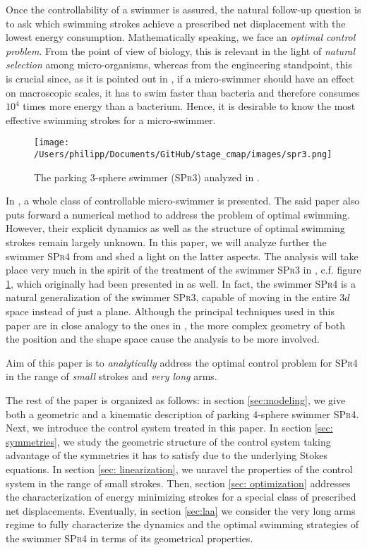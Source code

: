 Once the controllability of a swimmer is assured, the natural follow-up question is to ask which swimming strokes achieve a prescribed net displacement with the lowest energy consumption. Mathematically speaking, we face an \emph{optimal control problem}. From the point of view of biology, this is relevant in the light of \emph{natural selection} among micro-organisms, whereas from the engineering standpoint, this is crucial since, as it is pointed out in \cite{Avron2004}, if a micro-swimmer should have an effect on macroscopic scales, it has to swim faster than bacteria and therefore consumes $10^4$ times more energy than a bacterium. Hence, it is desirable to know the most effective swimming strokes for a micro-swimmer.

\begin{figure}[h]
\centering
	\texttt{[image: /Users/philipp/Documents/GitHub/stage\_cmap/images/spr3.png]}
    \caption{The parking 3-sphere swimmer (\textsc{SPr3}) analyzed in \cite{Alouges2017}.}
    \label{fig:spr3}
\end{figure}

In \cite{Alouges2013}, a whole class of controllable micro-swimmer is presented. The said paper also puts forward a numerical method to address the problem of optimal swimming. However, their explicit dynamics as well as the structure of optimal swimming strokes remain largely unknown. In this paper, we will analyze further the swimmer \textsc{SPr4} from \cite{Alouges2013} and shed a light on the latter aspects. The analysis will take place very much in the spirit of the treatment of the swimmer \textsc{SPr3} in \cite{Alouges2017}, c.f. figure \ref{fig:spr3}, which originally had been presented in \cite{Alouges2013} as well. In fact, the swimmer \textsc{SPr4} is a natural generalization of the swimmer \textsc{SPr3}, capable of moving in the entire $3d$ space instead of just a plane. Although the principal techniques used in this paper are in close analogy to the ones in \cite{Alouges2017}, the more complex geometry of both the position and the shape space cause the analysis to be more involved.

Aim of this paper is to \emph{analytically} address the optimal control problem for \textsc{SPr4} in the range of \emph{small} strokes and \emph{very long} arms.

The rest of the paper is organized as follows: in section \ref{sec:modeling}, we give both a geometric and a kinematic description of parking 4-sphere swimmer \textsc{SPr4}. Next, we introduce the control system treated in this paper. In section \ref{sec: symmetries}, we study the geometric structure of the control system taking advantage of the symmetries it has to satisfy due to the underlying Stokes  equations. In section \ref{sec: linearization}, we unravel the properties of the control system in the range of small strokes. Then, section \ref{sec: optimization} addresses the characterization of energy minimizing strokes for a special class of prescribed net displacements. Eventually, in section \ref{sec:laa} we consider the very long arms regime to fully characterize the dynamics and the optimal swimming strategies of the swimmer \textsc{SPr4} in terms of its geometrical properties.




